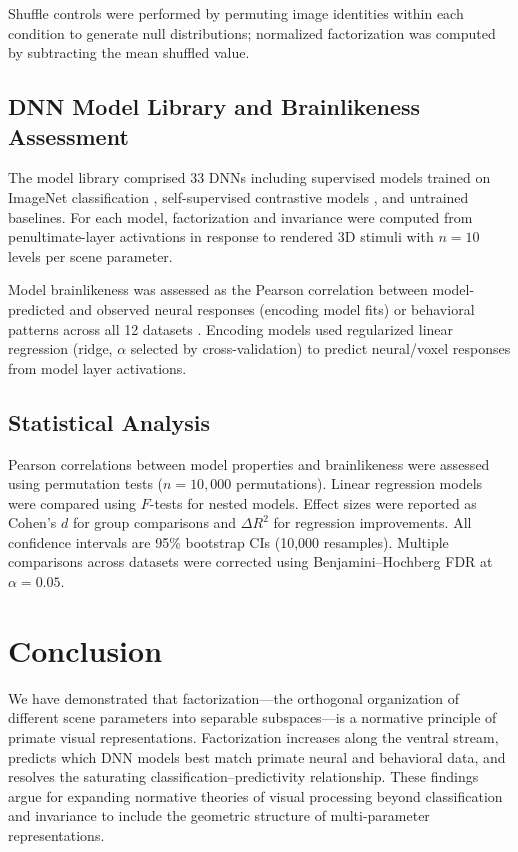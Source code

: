 \documentclass[11pt]{article}
\begin{document}
Shuffle controls were performed by permuting image identities within each condition to generate null distributions; normalized factorization was computed by subtracting the mean shuffled value.

\subsection{DNN Model Library and Brainlikeness Assessment}

The model library comprised 33 DNNs including supervised models trained on ImageNet classification \citep{krizhevsky2012imagenet, he2016deep, deng2009imagenet}, self-supervised contrastive models \citep{chen2020simple, he2020momentum}, and untrained baselines. For each model, factorization and invariance were computed from penultimate-layer activations in response to rendered 3D stimuli with $n = 10$ levels per scene parameter.

Model brainlikeness was assessed as the Pearson correlation between model-predicted and observed neural responses (encoding model fits) or behavioral patterns across all 12 datasets \citep{schrimpf2018brain, rajalingham2018large}. Encoding models used regularized linear regression (ridge, $\alpha$ selected by cross-validation) to predict neural/voxel responses from model layer activations.

\subsection{Statistical Analysis}

Pearson correlations between model properties and brainlikeness were assessed using permutation tests ($n = 10{,}000$ permutations). Linear regression models were compared using $F$-tests for nested models. Effect sizes were reported as Cohen's $d$ for group comparisons and $\Delta R^2$ for regression improvements. All confidence intervals are 95\% bootstrap CIs (10{,}000 resamples). Multiple comparisons across datasets were corrected using Benjamini--Hochberg FDR at $\alpha = 0.05$.

\section{Conclusion}

We have demonstrated that factorization---the orthogonal organization of different scene parameters into separable subspaces---is a normative principle of primate visual representations. Factorization increases along the ventral stream, predicts which DNN models best match primate neural and behavioral data, and resolves the saturating classification--predictivity relationship. These findings argue for expanding normative theories of visual processing beyond classification and invariance to include the geometric structure of multi-parameter representations.



\end{document}
